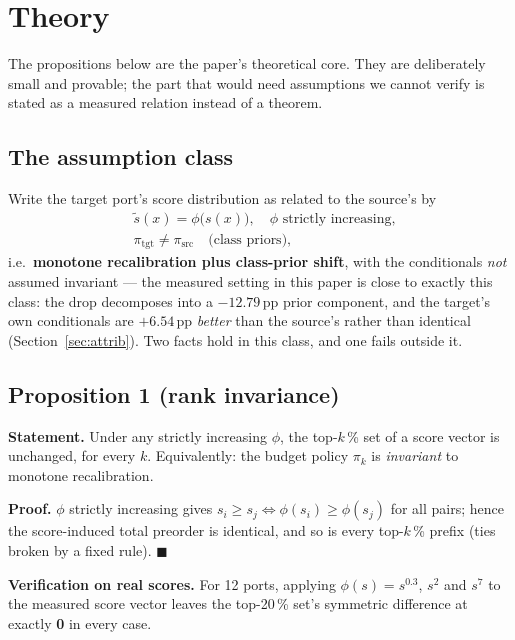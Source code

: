 \documentclass[journal]{IEEEtran}
\begin{document}
\section{Theory}
\label{sec:theory}

The propositions below are the paper's theoretical core. They are deliberately small and provable; the
part that would need assumptions we cannot verify is stated as a measured relation instead of a
theorem.

\subsection{The assumption class}

Write the target port's score distribution as related to the source's by
\begin{equation}
\begin{aligned}
&\tilde s(x) = \phi\big(s(x)\big), \quad \phi \text{ strictly increasing},\\
&\pi_{\text{tgt}} \neq \pi_{\text{src}} \quad \text{(class priors)},
\end{aligned}
\end{equation}
i.e.\ \textbf{monotone recalibration plus class-prior shift}, with the conditionals \emph{not} assumed
invariant --- the measured setting in this paper is close to exactly this class: the drop decomposes
into a $-12.79$\,pp prior component, and the target's own conditionals are $+6.54$\,pp \emph{better}
than the source's rather than identical (Section~\ref{sec:attrib}). Two facts hold in this class, and
one fails outside it.

\subsection{Proposition 1 (rank invariance)}

\textbf{Statement.} Under any strictly increasing $\phi$, the top-$k$\,\% set of a score vector is
unchanged, for every $k$. Equivalently: the budget policy $\pi_k$ is \emph{invariant} to monotone
recalibration.

\textbf{Proof.} $\phi$ strictly increasing gives $s_i \ge s_j \iff \phi(s_i) \ge \phi(s_j)$ for all
pairs; hence the score-induced total preorder is identical, and so is every top-$k$\,\% prefix (ties
broken by a fixed rule). \hfill$\blacksquare$

\textbf{Verification on real scores.} For 12 ports, applying $\phi(s)=s^{0.3}$, $s^{2}$ and $s^{7}$ to
the measured score vector leaves the top-20\,\% set's symmetric difference at exactly \textbf{0} in
every case.
\end{document}
